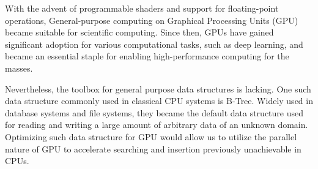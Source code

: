 With the advent of programmable shaders and support for floating-point operations, General-purpose computing on Graphical Processing Units (GPU) became suitable for scientific computing. Since then, GPUs have gained significant adoption for various computational tasks, such as deep learning, and became an essential staple for enabling high-performance computing for the masses.

Nevertheless, the toolbox for general purpose data structures is lacking. One such data structure commonly used in classical CPU systems is B-Tree. Widely used in database systems and file systems, they became the default data structure used for reading and writing a large amount of arbitrary data of an unknown domain. Optimizing such data structure for GPU would allow us to utilize the parallel nature of GPU to accelerate searching and insertion previously unachievable in CPUs.